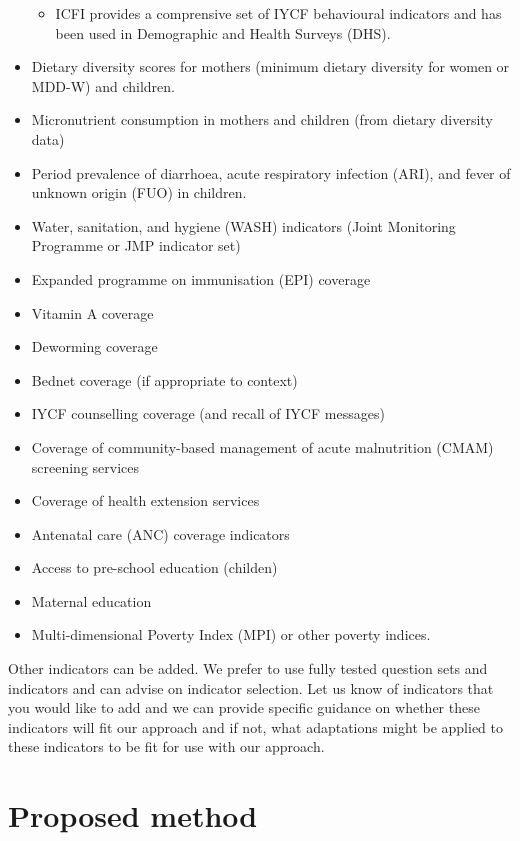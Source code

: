 \documentclass[12pt,a4paper]{article}
\providecommand{\tightlist}{%
  \setlength{\itemsep}{0pt}\setlength{\parskip}{0pt}}
\begin{document}
\begin{itemize}
  \begin{itemize}
  \tightlist
  \item
    ICFI provides a comprensive set of IYCF behavioural indicators and has been used in Demographic and Health Surveys (DHS).
  \end{itemize}
\item
  Dietary diversity scores for mothers (minimum dietary diversity for women or MDD-W) and children.
\item
  Micronutrient consumption in mothers and children (from dietary diversity data)
\item
  Period prevalence of diarrhoea, acute respiratory infection (ARI), and fever of unknown origin (FUO) in children.
\item
  Water, sanitation, and hygiene (WASH) indicators (Joint Monitoring Programme or JMP indicator set)
\item
  Expanded programme on immunisation (EPI) coverage
\item
  Vitamin A coverage
\item
  Deworming coverage
\item
  Bednet coverage (if appropriate to context)
\item
  IYCF counselling coverage (and recall of IYCF messages)
\item
  Coverage of community-based management of acute malnutrition (CMAM) screening services
\item
  Coverage of health extension services
\item
  Antenatal care (ANC) coverage indicators
\item
  Access to pre-school education (childen)
\item
  Maternal education
\item
  Multi-dimensional Poverty Index (MPI) or other poverty indices.
\end{itemize}

Other indicators can be added. We prefer to use fully tested question sets and indicators and can advise on indicator selection. Let us know of indicators that you would like to add and we can provide specific guidance on whether these indicators will fit our approach and if not, what adaptations might be applied to these indicators to be fit for use with our approach.

\hypertarget{proposed-method}{%
\section{Proposed method}\label{proposed-method}}
\end{document}
